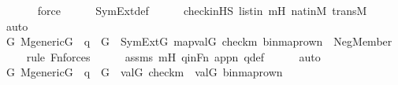 \begin{isabellebody}
\ \ \ \ \ \isamarkupfalse%
\ force\isanewline
\ \ \ \ \isamarkupfalse%
\ SymExt{\isacharunderscore}{\kern0pt}def\isanewline
\ \ \ \ \isamarkupfalse%
\ check{\isacharunderscore}{\kern0pt}in{\isacharunderscore}{\kern0pt}HS\ listin\ mH\ nat{\isacharunderscore}{\kern0pt}in{\isacharunderscore}{\kern0pt}M\ transM\isanewline
\ \ \ \ \isamarkupfalse%
\ auto\isanewline
\isanewline
\ \ \isamarkupfalse%
\ {\isachardoublequoteopen}{\isasymforall}G{\isachardot}{\kern0pt}\ M{\isacharunderscore}{\kern0pt}generic{\isacharparenleft}{\kern0pt}G{\isacharparenright}{\kern0pt}\ {\isasymand}\ q\ {\isasymin}\ G\ {\isasymlongrightarrow}\ SymExt{\isacharparenleft}{\kern0pt}G{\isacharparenright}{\kern0pt}{\isacharcomma}{\kern0pt}\ map{\isacharparenleft}{\kern0pt}val{\isacharparenleft}{\kern0pt}G{\isacharparenright}{\kern0pt}{\isacharcomma}{\kern0pt}\ {\isacharbrackleft}{\kern0pt}check{\isacharparenleft}{\kern0pt}m{\isacharparenright}{\kern0pt}{\isacharcomma}{\kern0pt}\ binmap{\isacharunderscore}{\kern0pt}row{\isacharprime}{\kern0pt}{\isacharparenleft}{\kern0pt}n{\isacharprime}{\kern0pt}{\isacharparenright}{\kern0pt}{\isacharbrackright}{\kern0pt}{\isacharparenright}{\kern0pt}\ {\isasymTurnstile}\ Neg{\isacharparenleft}{\kern0pt}Member{\isacharparenleft}{\kern0pt}{}{\isacharcomma}{\kern0pt}\ {}{\isacharparenright}{\kern0pt}{\isacharparenright}{\kern0pt}{\isachardoublequoteclose}\isanewline
\ \ \ \ \isamarkupfalse%
{\isacharparenleft}{\kern0pt}rule\ Fn{\isacharunderscore}{\kern0pt}{}{\isacharunderscore}{\kern0pt}forces{\isacharparenright}{\kern0pt}\isanewline
\ \ \ \ \isamarkupfalse%
\ assms\ mH\ qinFn\ appn{\isacharprime}{\kern0pt}\ q{\isacharunderscore}{\kern0pt}def\isanewline
\ \ \ \ \isamarkupfalse%
\ auto\isanewline
\ \ \isamarkupfalse%
\ \isamarkupfalse%
\ {\isachardoublequoteopen}{\isasymforall}G{\isachardot}{\kern0pt}\ M{\isacharunderscore}{\kern0pt}generic{\isacharparenleft}{\kern0pt}G{\isacharparenright}{\kern0pt}\ {\isasymand}\ q\ {\isasymin}\ G\ {\isasymlongrightarrow}\ val{\isacharparenleft}{\kern0pt}G{\isacharcomma}{\kern0pt}\ check{\isacharparenleft}{\kern0pt}m{\isacharparenright}{\kern0pt}{\isacharparenright}{\kern0pt}\ {\isasymnotin}\ val{\isacharparenleft}{\kern0pt}G{\isacharcomma}{\kern0pt}\ binmap{\isacharunderscore}{\kern0pt}row{\isacharprime}{\kern0pt}{\isacharparenleft}{\kern0pt}n{\isacharprime}{\kern0pt}{\isacharparenright}{\kern0pt}{\isacharparenright}{\kern0pt}{\isachardoublequoteclose}\isanewline

\end{isabellebody}
